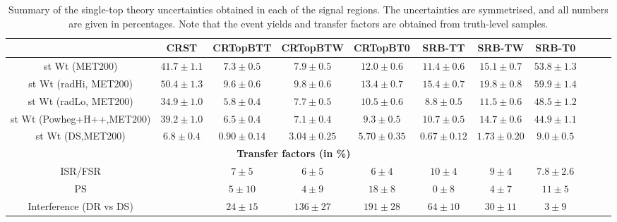 \begin{description}
  \begin{table}[!h]
    \begin{center} \footnotesize
   \begin{tabular}{|c|c|c|c|c|c|c|c|c|c|c|} 
        \hline
        & CRST & CRTopBTT & CRTopBTW & CRTopBT0 & SRB-TT & SRB-TW & SRB-T0 \\ \hline
        \hline \hline 
       st Wt (MET200)&          $41.7\pm 1.1$&          $7.3\pm 0.5$&   $7.9\pm 0.5$&   $12.0\pm 0.6$&          $11.4\pm 0.6$&          $15.1\pm 0.7$&          $53.8\pm 1.3$\\
st Wt (radHi, MET200)&   $50.4\pm 1.3$&          $9.6\pm 0.6$&   $9.8\pm 0.6$&   $13.4\pm 0.7$&          $15.4\pm 0.7$&          $19.8\pm 0.8$&          $59.9\pm 1.4$\\
st Wt (radLo, MET200)&   $34.9\pm 1.0$&          $5.8\pm 0.4$&   $7.7\pm 0.5$&   $10.5\pm 0.6$&          $8.8\pm 0.5$&   $11.5\pm 0.6$&          $48.5\pm 1.2$\\
st Wt (Powheg+H++,MET200)&       $39.2\pm 1.0$&          $6.5\pm 0.4$&   $7.1\pm 0.4$&   $9.3\pm 0.5$&   $10.7\pm 0.5$&          $14.7\pm 0.6$&          $44.9\pm 1.1$\\
st Wt (DS,MET200)&       $6.8\pm 0.4$&   $0.90\pm 0.14$&         $3.04\pm 0.25$&         $5.70\pm 0.35$&         $0.67\pm 0.12$&         $1.73\pm 0.20$&         $9.0\pm 0.5$\\
        \hline
        \multicolumn{8}{c}{\bf Transfer factors (in \%)} \\ \hline        
        ISR/FSR &   &     $7\pm5$&        $6\pm5$&        $6\pm4$&        $10\pm4$&       $9\pm4$&        $7.8\pm2.6$\\
        PS &    &    $5\pm10$&       $4\pm9$&        $18\pm8$&       $0\pm8$&        $4\pm7$&        $11\pm5$\\
        Interference (DR vs DS) &   &     $24\pm15$&      $136\pm27$&     $191\pm28$&     $64\pm10$&      $30\pm11$&      $3\pm9$\\
       \hline
   \end{tabular}
    \end{center}
    \caption{Summary of the single-top theory uncertainties obtained in each of the signal regions. The uncertainties are symmetrised, and all numbers are given in percentages. Note that the event yields and transfer factors are obtained from truth-level samples. %
}
    \label{tab:single_top_unc2}
  \end{table}


\end{description}
